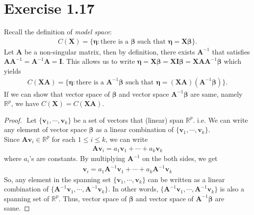 \documentclass[a4paper]{article}
\begin{document}
\section{Exercise 1.17}
Recall the definition of \textit{model space}: 
\begin{align*}
C(\bm{X}) = \{\bm{\eta}: \mbox{there is a $\bm{\beta}$ such that $\bm{\eta} = \bm{X}\bm{\beta}$}\}.
\end{align*}
Let $\bm{A}$ be a non-singular matrix, then by definition, there exists $\bm{A}^{-1}$ that satisfies $\bm{A}\bm{A}^{-1} = \bm{A}^{-1}\bm{A} = \bm{I}$. This allows us to write $\bm{\eta} = \bm{X}\bm{\beta} = \bm{X}\bm{I}\bm{\beta} = \bm{X}\bm{A}\bm{A}^{-1}\bm{\beta}$
which yields
\begin{align*}
C(\bm{X}\bm{A}) = \{\bm{\eta}: \mbox{there is a $\bm{A}^{-1}\bm{\beta}$ such that $\bm{\eta} = (\bm{X}\bm{A}) (\bm{A}^{-1}\bm{\beta})$}\}.
\end{align*}
If we can show that vector space of $\bm{\beta}$ and vector space $\bm{A}^{-1}\bm{\beta}$ are same, namely $\mathbb{R}^{p}$, we have $C(\bm{X}) = C(\bm{X}\bm{A})$.

\begin{proof} $ $\newline
Let $\{\bm{v}_{1}, \cdots ,\bm{v}_{k}\}$ be a set of vectors that (linear) span $\mathbb{R}^{p}$. i.e. We can write any element of vector space $\bm{\beta}$ as a linear combination of $\{\bm{v}_{1}, \cdots ,\bm{v}_{k}\}$.\\
Since $\bm{A}\bm{v}_{i} \in \mathbb{R}^{p}$ for each $1 \leq i \leq k$, we can write
\begin{align*}
\bm{A}\bm{v}_{i} = a_{1}\bm{v}_{1} + \cdots + a_{k}\bm{v}_{k}
\end{align*}
where $a_{i}$'s are constants. By multiplying $\bm{A}^{-1}$ on the both sides, we get
\begin{align*}
\bm{v}_{i} = a_{1}\bm{A}^{-1}\bm{v}_{1} + \cdots + a_{k}\bm{A}^{-1}\bm{v}_{k}
\end{align*}
So, any element in the spanning set $\{\bm{v}_{1}, \cdots ,\bm{v}_{k}\}$ can be written as a linear combination of $\{\bm{A}^{-1}\bm{v}_{1}, \cdots ,\bm{A}^{-1}\bm{v}_{k}\}$. In other words, $\{\bm{A}^{-1}\bm{v}_{1}, \cdots ,\bm{A}^{-1}\bm{v}_{k}\}$ is also a spanning set of $\mathbb{R}^{p}$. Thus, vector space of $\bm{\beta}$ and vector space of $\bm{A}^{-1}\bm{\beta}$ are same.
\end{proof}


\vspace{\baselineskip}
\end{document}
